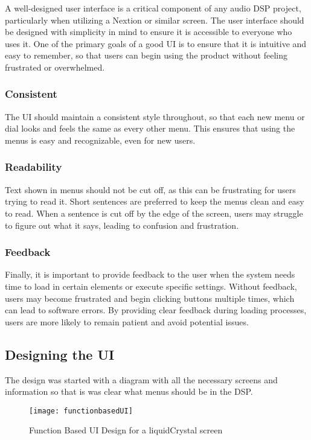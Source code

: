 A well-designed user interface is a critical component of any audio DSP project, particularly when utilizing a Nextion or similar screen. The user interface should be designed with simplicity in mind to ensure it is accessible to everyone who uses it. One of the primary goals of a good UI is to ensure that it is intuitive and easy to remember, so that users can begin using the product without feeling frustrated or overwhelmed.

\subsubsection*{Consistent}
The UI should maintain a consistent style throughout, so that each new menu or dial looks and feels the same as every other menu. This ensures that using the menus is easy and recognizable, even for new users.

\subsubsection*{Readability}
Text shown in menus should not be cut off, as this can be frustrating for users trying to read it. Short sentences are preferred to keep the menus clean and easy to read. When a sentence is cut off by the edge of the screen, users may struggle to figure out what it says, leading to confusion and frustration.

\subsubsection*{Feedback}
Finally, it is important to provide feedback to the user when the system needs time to load in certain elements or execute specific settings. Without feedback, users may become frustrated and begin clicking buttons multiple times, which can lead to software errors. By providing clear feedback during loading processes, users are more likely to remain patient and avoid potential issues.

\subsection{Designing the UI}
The design was started with a diagram with all the necessary screens and information so that is was clear what menus should be in the DSP. 

\begin{figure}[ht]
    \texttt{[image: functionbasedUI]}
    \caption{Function Based UI Design for a liquidCrystal screen}
    \label{fig:functionbasedUI}
\end{figure}

